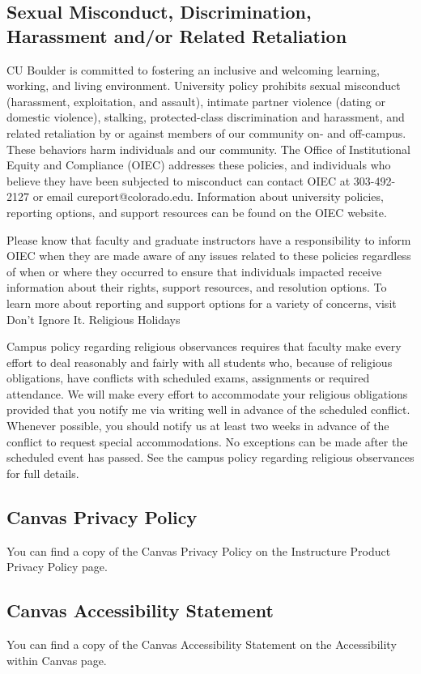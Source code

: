 \subsection{Sexual Misconduct, Discrimination, Harassment and/or Related Retaliation}

CU Boulder is committed to fostering an inclusive and welcoming learning, working, and living environment. University policy prohibits sexual misconduct (harassment, exploitation, and assault), intimate partner violence (dating or domestic violence), stalking, protected-class discrimination and harassment, and related retaliation by or against members of our community on- and off-campus. These behaviors harm individuals and our community. The Office of Institutional Equity and Compliance (OIEC) addresses these policies, and individuals who believe they have been subjected to misconduct can contact OIEC at 303-492-2127 or email cureport@colorado.edu. Information about university policies, reporting options, and support resources can be found on the OIEC website.

Please know that faculty and graduate instructors have a responsibility to inform OIEC when they are made aware of any issues related to these policies regardless of when or where they occurred to ensure that individuals impacted receive information about their rights, support resources, and resolution options. To learn more about reporting and support options for a variety of concerns, visit Don’t Ignore It.
Religious Holidays

Campus policy regarding religious observances requires that faculty make every effort to deal reasonably and fairly with all students who, because of religious obligations, have conflicts with scheduled exams, assignments or required attendance. We will make every effort to accommodate your religious obligations provided that you notify me via writing well in advance of the scheduled conflict. Whenever possible, you should notify us at least two weeks in advance of the conflict to request special accommodations. No exceptions can be made after the scheduled event has passed. See the campus policy regarding religious observances for full details.

\subsection{Canvas Privacy Policy}

You can find a copy of the Canvas Privacy Policy on the Instructure Product Privacy Policy page.

\subsection{Canvas Accessibility Statement}

You can find a copy of the Canvas Accessibility Statement on the Accessibility within Canvas page.